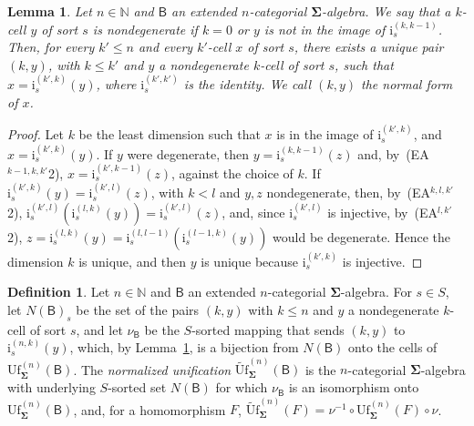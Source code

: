 \documentclass{amsart}
\theoremstyle{plain}
\newtheorem{lemma}[theorem]{Lemma}
\theoremstyle{definition}
\newtheorem{definition}[theorem]{Definition}
\begin{document}
\begin{lemma}\label{LNormalForm}
Let $n\in\mathbb{N}$ and $\boldsymbol{\mathsf{B}}$ an extended $n$-categorial $\mathbf{\Sigma}$-algebra. We say that a $k$-cell $y$ of sort $s$ is \emph{nondegenerate} if $k=0$ or $y$ is not in the image of $\mathrm{i}^{(k,k-1)}_{s}$. Then, for every $k'\leq n$ and every $k'$-cell $x$ of sort $s$, there exists a unique pair $(k,y)$, with $k\leq k'$ and $y$ a nondegenerate $k$-cell of sort $s$, such that $x=\mathrm{i}^{(k',k)}_{s}(y)$, where $\mathrm{i}^{(k',k')}_{s}$ is the identity. We call $(k,y)$ the \emph{normal form} of $x$.
\end{lemma}
\begin{proof}
Let $k$ be the least dimension such that $x$ is in the image of $\mathrm{i}^{(k',k)}_{s}$, and $x=\mathrm{i}^{(k',k)}_{s}(y)$. If $y$ were degenerate, then $y=\mathrm{i}^{(k,k-1)}_{s}(z)$ and, by~(EA$^{k-1,k,k'}$2), $x=\mathrm{i}^{(k',k-1)}_{s}(z)$, against the choice of $k$. If $\mathrm{i}^{(k',k)}_{s}(y)=\mathrm{i}^{(k',l)}_{s}(z)$, with $k<l$ and $y,z$ nondegenerate, then, by~(EA$^{k,l,k'}$2), $\mathrm{i}^{(k',l)}_{s}(\mathrm{i}^{(l,k)}_{s}(y))=\mathrm{i}^{(k',l)}_{s}(z)$, and, since $\mathrm{i}^{(k',l)}_{s}$ is injective, by~(EA$^{l,k'}$2), $z=\mathrm{i}^{(l,k)}_{s}(y)=\mathrm{i}^{(l,l-1)}_{s}(\mathrm{i}^{(l-1,k)}_{s}(y))$ would be degenerate. Hence the dimension $k$ is unique, and then $y$ is unique because $\mathrm{i}^{(k',k)}_{s}$ is injective.
\end{proof}

\begin{definition}\label{DNormUnif}
Let $n\in\mathbb{N}$ and $\boldsymbol{\mathsf{B}}$ an extended $n$-categorial $\mathbf{\Sigma}$-algebra. For $s\in S$, let $N(\boldsymbol{\mathsf{B}})_{s}$ be the set of the pairs $(k,y)$ with $k\leq n$ and $y$ a nondegenerate $k$-cell of sort $s$, and let $\nu_{\boldsymbol{\mathsf{B}}}$ be the $S$-sorted mapping that sends $(k,y)$ to $\mathrm{i}^{(n,k)}_{s}(y)$, which, by Lemma~\ref{LNormalForm}, is a bijection from $N(\boldsymbol{\mathsf{B}})$ onto the cells of $\mathrm{Uf}^{(n)}_{\mathbf{\Sigma}}(\boldsymbol{\mathsf{B}})$. The \emph{normalized unification} $\widetilde{\mathrm{Uf}}^{(n)}_{\mathbf{\Sigma}}(\boldsymbol{\mathsf{B}})$ is the $n$-categorial $\mathbf{\Sigma}$-algebra with underlying $S$-sorted set $N(\boldsymbol{\mathsf{B}})$ for which $\nu_{\boldsymbol{\mathsf{B}}}$ is an isomorphism onto $\mathrm{Uf}^{(n)}_{\mathbf{\Sigma}}(\boldsymbol{\mathsf{B}})$, and, for a homomorphism $F$, $\widetilde{\mathrm{Uf}}^{(n)}_{\mathbf{\Sigma}}(F)=\nu^{-1}\circ\mathrm{Uf}^{(n)}_{\mathbf{\Sigma}}(F)\circ\nu$.
\end{definition}
\end{document}
